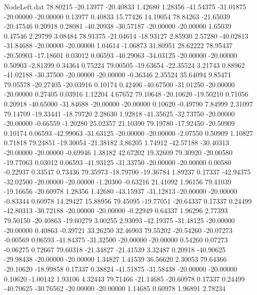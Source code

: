 \begin{filecontents}{NodeLeft.dat}
  78.80215  -20.13977  -20.40833     1.42680    1.28356  -41.54375  -31.01875  -20.00000  -20.00000    0.13977    0.40833   15.77426   14.19054
  78.84263  -21.65039  -20.47546     0.20918    0.28081  -40.20938  -30.57187  -20.00000  -20.00000    1.65039    0.47546    2.29799    3.08484
  78.91375  -21.04614  -18.93127     2.85930    2.57280  -40.02813  -31.84688  -20.00000  -20.00000    1.04614   -1.06873   31.80951   28.62222
  78.95437  -20.50903  -17.18601     0.03012    0.06593  -40.29063  -34.03125  -20.00000  -20.00000    0.50903   -2.81399    0.34364    0.75224
  79.00505  -19.63654  -22.35524     3.21743    0.88962  -41.02188  -30.37500  -20.00000  -20.00000   -0.36346    2.35524   35.64094    9.85471
  79.05578  -20.27405  -20.03916     0.10174    0.42406  -40.67500  -31.01250  -20.00000  -20.00000    0.27405    0.03916    1.12204    4.67652
  79.10648  -20.10620  -19.50210     0.71056    0.20918  -40.65000  -31.84688  -20.00000  -20.00000    0.10620   -0.49790    7.84999    2.31097
  79.14709  -19.33441  -18.79720     2.28630    1.92818  -41.35625  -32.73750  -20.00000  -20.00000   -0.66559   -1.20280   25.02357   21.10390
  79.19780  -17.92450  -20.50909     0.10174    0.06593  -42.99063  -31.63125  -20.00000  -20.00000   -2.07550    0.50909    1.10827    0.71818
  79.24851  -19.30054  -21.38182     3.86205    1.74912  -42.57188  -30.40313  -20.00000  -20.00000   -0.69946    1.38182   42.67202   19.32609
  79.30920  -20.00580  -19.77063     0.03012    0.06593  -41.93125  -31.33750  -20.00000  -20.00000    0.00580   -0.22937    0.33547    0.73436
  79.35973  -18.79700  -19.36784     1.89237    0.17337  -42.94375  -32.02500  -20.00000  -20.00000   -1.20300   -0.63216   21.41092    1.96156
  79.41039  -19.16656  -20.60978     1.28356    1.42680  -43.15937  -31.12813  -20.00000  -20.00000   -0.83344    0.60978   14.29427   15.88956
  79.45095  -19.77051  -20.64337     0.17337    0.24499  -42.80313  -30.72188  -20.00000  -20.00000   -0.22949    0.64337    1.96296    2.77393
  79.50150  -20.40863  -19.60279     3.00255    2.93093  -42.19375  -31.48125  -20.00000  -20.00000    0.40863   -0.39721   33.26250   32.46903
  79.55202  -20.54260  -20.07273    -0.00569    0.06593  -41.84375  -31.32500  -20.00000  -20.00000    0.54260    0.07273   -0.06275    0.72667
  79.60318  -21.34827  -21.41539     3.32487    0.20918  -40.90625  -29.98438  -20.00000  -20.00000    1.34827    1.41539   36.56620    2.30053
  79.64366  -20.10620  -18.99858     0.17337    0.38824  -41.51875  -31.58438  -20.00000  -20.00000    0.10620   -1.00142    1.93106    4.32443
  79.71466  -21.14685  -20.60978     0.17337    0.24499  -40.70625  -30.76562  -20.00000  -20.00000    1.14685    0.60978    1.96891    2.78234

\end{filecontents}
